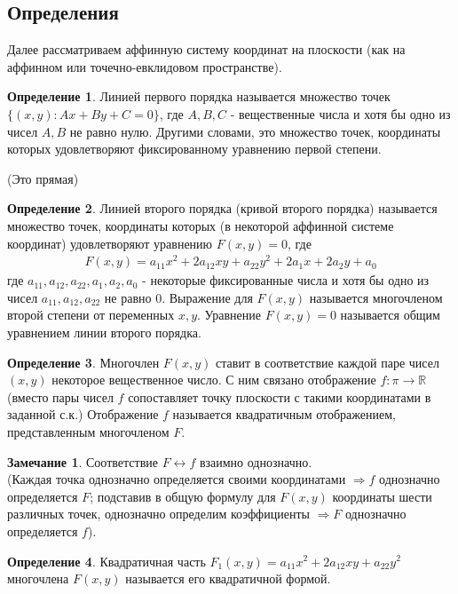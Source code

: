 \documentclass[a4paper, 12pt]{article}
\theoremstyle{definition}
\newtheorem*{definition}{Определение}
\newtheorem*{remark}{Замечание}
\begin{document}
	\subsection{Определения}
	Далее рассматриваем аффинную систему координат на плоскости (как на аффинном или точечно-евклидовом пространстве).
	\begin{definition}
		Линией первого порядка называется множество точек $\{(x, y): Ax + By + C =0\}$, где $A, B, C$ - вещественные числа и хотя бы одно из чисел $A, B$ не равно нулю. Другими словами, это множество точек, координаты которых удовлетворяют фиксированному уравнению первой степени.
	\end{definition}
	(Это прямая)
	\begin{definition}
		Линией второго порядка (кривой второго порядка) называется множество точек, координаты которых (в некоторой аффинной системе координат) удовлетворяют уравнению $F(x, y) = 0$, где \begin{align*}
			F(x, y) = a_{11}x^2 + 2a_{12}xy + a_{22}y^2 + 2a_{1}x + 2a_{2}y + a_{0}
		\end{align*}
		где $a_{11}, a_{12}, a_{22} , a_1, a_2, a_0$ - некоторые фиксированные числа и хотя бы одно из чисел $a_{11}, a_{12}, a_{22}$ не равно 0. Выражение для $F(x, y)$ называется многочленом второй степени от переменных $x, y$. Уравнение $F(x, y) = 0$ называется общим уравнением линии второго порядка.
	\end{definition}
	\begin{definition}
		Многочлен $F(x, y)$ ставит в соответствие каждой паре чисел $(x, y)$ некоторое вещественное число. С ним связано отображение $f: \pi \rightarrow \mathbb{R}$ (вместо пары чисел $f$ сопоставляет точку плоскости с такими координатами в заданной с.к.) Отображение $f$ называется квадратичным отображением, представленным многочленом $F$.
	\end{definition}
	\begin{remark}
		Соответствие $F \leftrightarrow f$ взаимно однозначно.\\
		(Каждая точка однозначно определяется своими координатами $\Rightarrow f$ однозначно определяется $F$; подставив в общую формулу для $F(x, y)$ координаты шести различных точек, однозначно определим коэффициенты $\Rightarrow F$ однозначно определяется $f$).
	\end{remark}
	\begin{definition}
		Квадратичная часть $F_1(x, y) = a_{11}x^2 + 2a_{12}xy + a_{22}y^2$ многочлена $F(x, y)$ называется его квадратичной формой.
	\end{definition}
\end{document}

